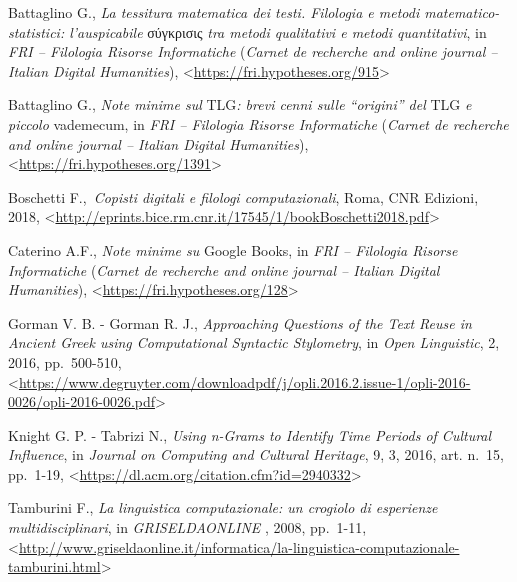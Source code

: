 \documentclass[
  b5paper,
  twoside,
  11pt,
  chapterprefix=false,
  bibliography=totocnumbered,
  parskip=0]{scrbook}
\begin{document}
Battaglino G., \emph{La tessitura matematica dei testi. Filologia e metodi
matematico-statistici: l'auspicabile} σύγκρισις \emph{tra metodi qualitativi
e metodi quantitativi}, in \emph{FRI -- Filologia Risorse Informatiche}
(\emph{Carnet de recherche and online journal -- Italian Digital
Humanities}),
\textless{}\href{https://fri.hypotheses.org/915}{{https://fri.hypotheses.org/915}}\textgreater{}

Battaglino G., \emph{Note minime sul} TLG\emph{: brevi cenni sulle \enquote{origini} del}
TLG \emph{e piccolo} vademecum, in \emph{FRI -- Filologia Risorse Informatiche}
(\emph{Carnet de recherche and online journal -- Italian Digital
Humanities}),
\textless{}\href{https://fri.hypotheses.org/1391}{{https://fri.hypotheses.org/1391}}\textgreater{}

Boschetti F.,~\emph{Copisti digitali e filologi computazionali}, Roma, CNR
Edizioni, 2018,
\textless{}\href{http://eprints.bice.rm.cnr.it/17545/1/bookBoschetti2018.pdf}{{http://eprints.bice.rm.cnr.it/17545/1/bookBoschetti2018.pdf}}\textgreater{}

Caterino A.F., \emph{Note minime su} Google Books, in \emph{FRI -- Filologia
Risorse Informatiche} (\emph{Carnet de recherche and online journal --
Italian Digital Humanities}),
\textless{}\href{https://fri.hypotheses.org/128}{{https://fri.hypotheses.org/128}}\textgreater{}

Gorman V. B. - Gorman R. J., \emph{Approaching Questions of the Text Reuse in
Ancient Greek using Computational Syntactic Stylometry}, in \emph{Open
Linguistic}, 2, 2016, pp.~500-510,
\textless{}\href{https://www.degruyter.com/downloadpdf/j/opli.2016.2.issue-1/opli-2016-0026/opli-2016-0026.pdf}{{https://www.degruyter.com/downloadpdf/j/opli.2016.2.issue-1/opli-2016-0026/opli-2016-0026.pdf}}\textgreater{}

Knight G. P. - Tabrizi N., \emph{Using n-Grams to Identify Time Periods of
Cultural Influence}, in \emph{Journal on Computing and Cultural Heritage}, 9,
3, 2016, art. n.~15, pp.~1-19,
\textless{}\href{https://dl.acm.org/citation.cfm?id=2940332}{{https://dl.acm.org/citation.cfm?id=2940332}}\textgreater{}

Tamburini F., \emph{La linguistica computazionale: un crogiolo di esperienze
multidisciplinari}, in \emph{GRISELDAONLINE} , 2008, pp.~1-11,
\textless{}\href{http://www.griseldaonline.it/informatica/la-linguistica-computazionale-tamburini.html}{{http://www.griseldaonline.it/informatica/la-linguistica-computazionale-tamburini.html}}\textgreater{}
\end{document}
